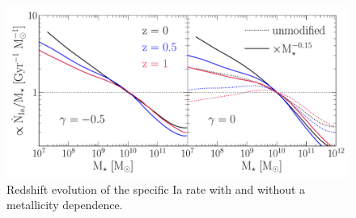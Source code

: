 \documentclass[ms.tex]{subfiles}
\begin{document}
\begin{itemize}
\begin{figure}
\centering
\includegraphics[scale = 0.56]{umachine_iarate_redshiftevol.pdf}
\caption{
Redshift evolution of the specific Ia rate with and without a metallicity
dependence.
}
\label{fig:specia_zdep}
\end{figure}


\end{itemize}
\end{document}
